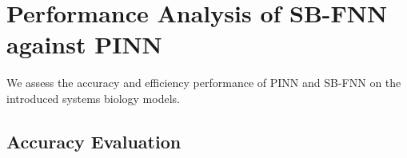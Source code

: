
\section{Performance Analysis of SB-FNN against PINN}

We assess the accuracy and efficiency performance of PINN and SB-FNN on the introduced systems biology models. 

\subsection{Accuracy Evaluation}

